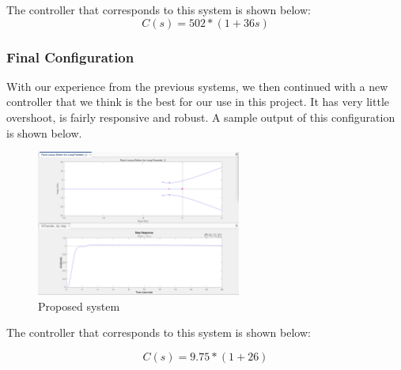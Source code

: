 The controller that corresponds to this system is shown below:
\begin{equation}
        C(s) = 502 * (1 + 36s)
\end{equation}

\subsubsection{Final Configuration}
With our experience from the previous systems, we then continued with a new controller that we think is the best for our use in this project. It has very little overshoot, is fairly responsive and robust. A sample output of this configuration is shown below.


\begin{figure}[H]
    \centering
    \includegraphics[width=0.6\textwidth]{images/fisek_response.png}
    \caption{Proposed system}
    \label{fig:fisek}
\end{figure}

The controller that corresponds to this system is shown below:

\begin{equation}
        C(s) = 9.75 * (1 + 26)
\end{equation}



